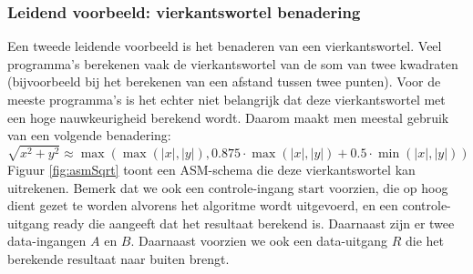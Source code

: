 \subsubsection{Leidend voorbeeld: vierkantswortel benadering}
Een tweede leidende voorbeeld is het benaderen van een vierkantswortel. Veel programma's berekenen vaak de vierkantswortel van de som van twee kwadraten (bijvoorbeeld bij het berekenen van een afstand tussen twee punten). Voor de meeste programma's is het echter niet belangrijk dat deze vierkantswortel met een hoge nauwkeurigheid berekend wordt. Daarom maakt men meestal gebruik van een volgende benadering:
\begin{equation}
\sqrt{x^2+y^2}\approx\max\left(\max\left(\left|x\right|,\left|y\right|\right),0.875\cdot\max\left(\left|x\right|,\left|y\right|\right)+0.5\cdot\min\left(\left|x\right|,\left|y\right|\right)\right)
\end{equation}
Figuur \ref{fig:asmSqrt} toont een ASM-schema die deze vierkantswortel kan uitrekenen. Bemerk dat we ook een controle-ingang $\mbox{start}$ voorzien, die op hoog dient gezet te worden alvorens het algoritme wordt uitgevoerd, en een controle-uitgang $\mbox{ready}$ die aangeeft dat het resultaat berekend is. Daarnaast zijn er twee data-ingangen $A$ en $B$. Daarnaast voorzien we ook een data-uitgang $R$ die het berekende resultaat naar buiten brengt.
